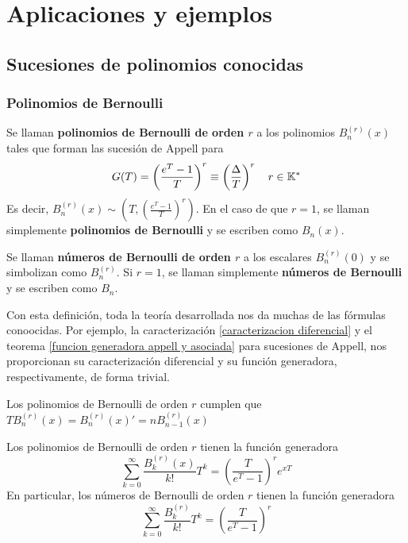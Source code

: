 \chapter{Aplicaciones y ejemplos}

\section{Sucesiones de polinomios conocidas}

\subsection{Polinomios de Bernoulli}

\begin{definicion}
    Se llaman \textbf{polinomios de Bernoulli de orden $r$} a los polinomios $B_n^{(r)}(x)$ tales que forman las sucesión de Appell para
    \begin{equation*}
        G(T) = \left(\frac{e^T - 1}{T}\right)^r \equiv \left(\frac{\Delta}{T}\right)^r \quad r \in \mathbb{K}^*
    \end{equation*}
    Es decir, $B_n^{(r)}(x) \sim (T, (\frac{e^T - 1}{T})^r)$. En el caso de que $r = 1$, se llaman simplemente \textbf{polinomios de Bernoulli} y se escriben como $B_n(x)$.
\end{definicion}

\begin{definicion}
    Se llaman \textbf{números de Bernoulli de orden $r$} a los escalares $B_n^{(r)}(0)$ y se simbolizan como $B_n^{(r)}$. Si $r=1$, se llaman simplemente \textbf{números de Bernoulli} y se escriben como $B_n$.
\end{definicion}

Con esta definición, toda la teoría desarrollada nos da muchas de las fórmulas conoocidas. Por ejemplo, la caracterización \ref{caracterizacion diferencial} y el teorema \ref{funcion generadora appell y asociada} para sucesiones de Appell, nos proporcionan su caracterización diferencial y su función generadora, respectivamente, de forma trivial. 

\begin{proposicion}\label{recurrencia bernoulli}
    Los polinomios de Bernoulli de orden $r$ cumplen que $T B_n^{(r)}(x)= B_n^{(r)}(x)' = n B_{n-1}^{(r)}(x)$
\end{proposicion}

\begin{proposicion}\label{generadora polinomios bernoulli}
    Los polinomios de Bernoulli de orden $r$ tienen la función generadora
    \begin{equation*}
    \sum_{k=0}^\infty \frac{B_k^{(r)}(x)}{k!} T^k = \left(\frac{T}{e^T - 1}\right)^r e^{x T}
    \end{equation*}
    En particular, los números de Bernoulli de orden $r$ tienen la función generadora
    \begin{equation*}
    \sum_{k=0}^\infty \frac{B_k^{(r)}}{k!} T^k = \left(\frac{T}{e^T - 1}\right)^r
    \end{equation*}
\end{proposicion}

